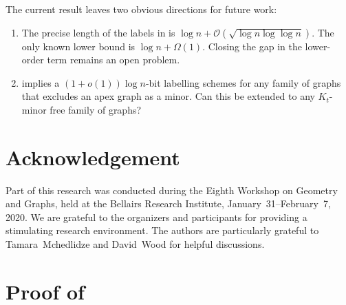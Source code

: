 \documentclass[kpfonts]{patmorin}
\newcommand{\snote}[1]{\fcolorbox{red}{yellow}{#1}}
\newcommand{\Oh}{\mathcal{O}}
\begin{document}
The current result leaves two obvious directions for future work:
\begin{enumerate}
  \item The precise length of the labels in  is $\log n + \Oh(\sqrt{\log n\log\log n})$.  The only known lower bound is $\log n + \Omega(1)$.  Closing the gap in the lower-order term remains an open problem.

  \item {} implies a $(1+o(1))\log n$-bit labelling schemes for any family of graphs that excludes an apex graph as a minor.  Can this be extended to any $K_t$-minor free family of graphs?
\end{enumerate}

\section*{Acknowledgement}

Part of this research was conducted during the Eighth Workshop on Geometry and Graphs, held at the Bellairs Research Institute, January~31--February~7, 2020.  We are grateful to the organizers and participants for providing a stimulating research environment.  The authors are particularly grateful to Tamara~Mchedlidze and David~Wood for helpful discussions.





\newpage
\appendix

\section{Proof of }
\end{document}

